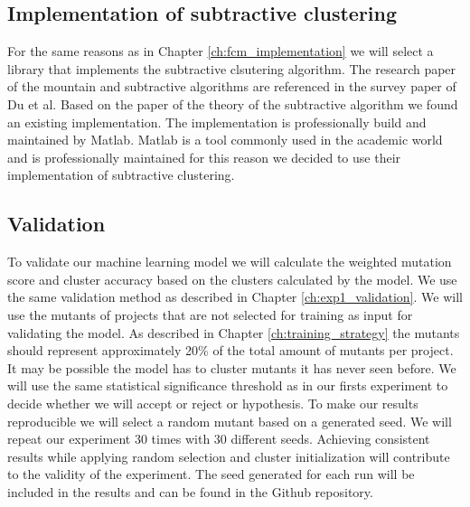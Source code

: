 \documentclass[../../main]{subfiles}
\begin{document}
\subsection{Implementation of subtractive clustering}
For the same reasons as in Chapter \ref{ch:fcm_implementation} we will select a library that implements the subtractive clsutering algorithm.
The research paper of the mountain and subtractive algorithms are referenced in the survey paper of Du et al\cite{Du2010Clustering:Approach}.
Based on the paper of the theory of the subtractive algorithm\cite{Chiu1994FuzzyEstimation} we found an existing implementation\cite{matlabSubtractive}.
The implementation is professionally build and maintained by Matlab\cite{matlabSubtractive}.
Matlab is a tool commonly used in the academic world and is professionally maintained for this reason we decided to use their implementation of subtractive clustering.

\subsection{Validation}
To validate our machine learning model we will calculate the weighted mutation score and cluster accuracy based on the clusters calculated by the model.
We use the same validation method as described in Chapter \ref{ch:exp1_validation}.
We will use the mutants of projects that are not selected for training as input for validating the model.
As described in Chapter \ref{ch:training_strategy} the mutants should represent approximately 20\% of the total amount of mutants per project.
It may be possible the model has to cluster mutants it has never seen before.
We will use the same statistical significance threshold as in our firsts experiment to decide whether we will accept or reject or hypothesis.
To make our results reproducible we will select a random mutant based on a generated seed.
We will repeat our experiment 30 times with 30 different seeds.
Achieving consistent results while applying random selection and cluster initialization will contribute to the validity of the experiment.
The seed generated for each run will be included in the results and can be found in the Github repository\cite{rbasarat-repo}.
\end{document}
